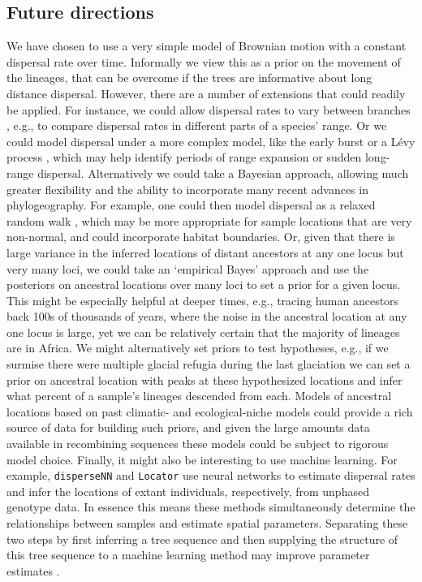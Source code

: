 \documentclass[12pt]{article}
\begin{document}
\subsection*{Future directions}

We have chosen to use a very simple model of Brownian motion with a constant dispersal rate over time. 
Informally we view this as a prior on the movement of the lineages, that can be overcome if the trees are informative about long distance dispersal. 
However, there are a number of extensions that could readily be applied.
For instance, we could allow dispersal rates to vary between branches \citep{o2006testing}, e.g., to compare dispersal rates in different parts of a species' range. 
Or we could model dispersal under a more complex model, like the early burst \citep{harmon2010early} or a L{\'e}vy process 
\citep{landis2013phylogenetic}, which may help identify periods of range expansion or sudden long-range dispersal.
Alternatively we could take a Bayesian approach, allowing much greater flexibility and the ability to incorporate many recent advances in phylogeography.
For example, one could then model dispersal as a relaxed random walk \citep{lemey2010phylogeography}, which may be more appropriate for sample locations that are very non-normal, and could incorporate habitat boundaries.
Or, given that there is large variance in the inferred locations of distant ancestors at any one locus \citep{schluter1997likelihood} but very many loci, we could take an `empirical Bayes' approach and use the posteriors on ancestral locations over many loci to set a prior for a given locus.
This might be especially helpful at deeper times, e.g., tracing human ancestors back 100s of thousands of years, where the noise in the ancestral location at any one locus is large, yet we can be relatively certain that the majority of lineages are in Africa.
We might alternatively set priors to test hypotheses, e.g., if we surmise there were multiple glacial refugia during the last glaciation we can set a prior on ancestral location with peaks at these hypothesized locations and infer what percent of a sample's lineages descended from each.
Models of ancestral locations based on past climatic- and ecological-niche models could provide a rich source of data for building such priors, and given the large amounts data available in recombining sequences these models could be subject to rigorous model choice.
Finally, it might also be interesting to use machine learning.
For example, \texttt{disperseNN} \citep{smith2023dispersal} and \texttt{Locator} \citep{battey2020predicting} use neural networks to estimate dispersal rates and infer the locations of extant individuals, respectively, from unphased genotype data.
In essence this means these methods simultaneously determine the relationships between samples and estimate spatial parameters.
Separating these two steps by first inferring a tree sequence and then supplying the structure of this tree sequence to a machine learning method may improve parameter estimates \citep{whitehouse2024tree}.
\end{document}
